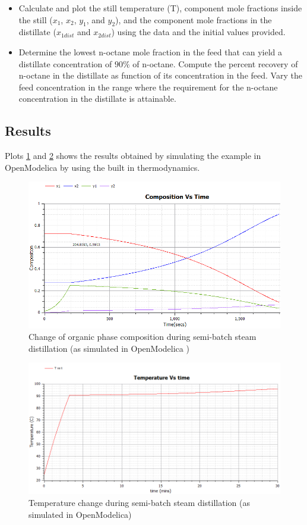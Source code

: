\documentclass[12pt]{report}
\begin{document}
\begin{itemize}
\item Calculate and plot the still temperature (T), component mole fractions inside the still ($x_1$, $x_2$, $y_1$, and $y_2$), and the component mole fractions in the distillate ($x_{1dist}$ and $x_{2dist}$) using the data and the initial values provided.
\item Determine the lowest n-octane mole fraction in the feed that can yield a distillate concentration of $90\%$ of n-octane. Compute the percent recovery of n-octane in the distillate as function of its concentration in the feed. Vary the feed concentration in the range where the requirement for the n-octane concentration in the distillate is attainable.
\end{itemize}

\subsection{Results}
Plots \ref{SD1} and \ref{SD2} shows the results obtained by simulating the example in OpenModelica by using the built in thermodynamics. \\
\begin{figure}
\centering
\includegraphics[width=0.8\linewidth]{SD1}
\caption{Change of organic phase composition during semi-batch steam distillation (as simulated in OpenModelica )}
\label{SD1}
\end{figure}
\begin{figure}
\centering
\includegraphics[width=0.8\linewidth]{SD2}
\caption{Temperature change during semi-batch steam distillation (as simulated in OpenModelica)}
\label{SD2}
\end{figure}
\end{document}
